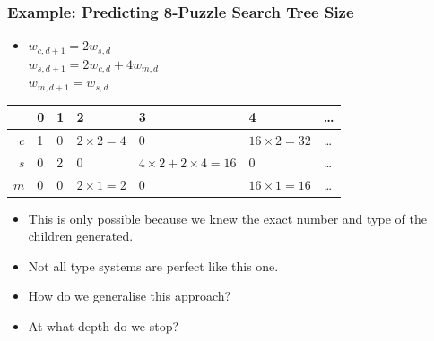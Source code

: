 \documentclass{beamer}
\begin{document}
\begin{frame}
  \frametitle{Example: Predicting 8-Puzzle Search Tree Size}
  \begin{itemize}
  \item \(w_{c,d+1} = 2w_{s,d}\)\\
    \(w_{s,d+1} = 2w_{c,d} + 4w_{m,d}\) \\
    \(w_{m,d+1} = w_{s,d}\)
    \end{itemize}
  \begin{tabular}{r | l | l | l | l | l | l}
     & 0 & 1 & 2 & 3 & 4 & \ldots \\
    \hline
    \(c\) & 1 & 0 & \(2 \times 2 = 4\) & 0                              & \(16 \times 2 = 32\) & \ldots \\
    \(s\) & 0 & 2 & 0                  & \(4 \times 2 + 2 \times 4 = 16 \) & 0 & \ldots \\
    \(m\) & 0 & 0 & \(2 \times 1 = 2\) & 0                              & \(16 \times 1 = 16\) & \ldots
  \end{tabular}
  \begin{itemize}
  \item This is only possible because we knew the exact number and type of the children generated.
  \item Not all type systems are perfect like this one.
  \item How do we generalise this approach?
  \item At what depth do we stop?
  \end{itemize}
\end{frame}
\end{document}
